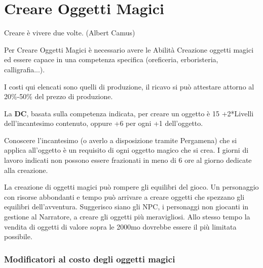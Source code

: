 \section{Creare Oggetti Magici}

\begin{changemargin}{0.3cm}{0.3cm}\begin{enfasi}{
\begin{center}
Creare è vivere due volte. (Albert Camus)
\end{center}
}\end{enfasi}\end{changemargin}\medskip

\begin{multicols}{2}

\label{creare-oggetti-magici}

Per Creare Oggetti Magici è necessario avere le Abilità Creazione oggetti magici ed essere capace in una competenza specifica (oreficeria, erboristeria, calligrafia...).

I costi qui elencati sono quelli di produzione, il ricavo si può attestare attorno al 20\%-50\% del prezzo di produzione. 

La \textbf{DC}, basata sulla competenza indicata, per creare un oggetto è 15 +2*Livelli dell'incantesimo contenuto, oppure +6 per ogni +1 dell'oggetto.

Conoscere l'incantesimo (o averlo a disposizione tramite Pergamena) che si applica all'oggetto è un requisito di ogni oggetto magico che si crea. I giorni di lavoro indicati non possono essere frazionati in meno di 6 ore al giorno dedicate alla creazione.

\begin{changemargin}{0.3cm}{0.3cm}\begin{narratore}
La creazione di oggetti magici può rompere gli equilibri del gioco. Un personaggio con risorse abbondanti e tempo può arrivare a creare oggetti che spezzano gli equilibri dell'avventura. Suggerisco siano gli NPC, i personaggi non giocanti in gestione al Narratore, a creare gli oggetti più meravigliosi. Allo stesso tempo la vendita di oggetti di valore sopra le 2000mo dovrebbe essere il più limitata possibile.
\end{narratore}\end{changemargin}

\subsubsection{Modificatori al costo degli oggetti magici}\label{modificatoricostooggettimagici}


\end{multicols}
